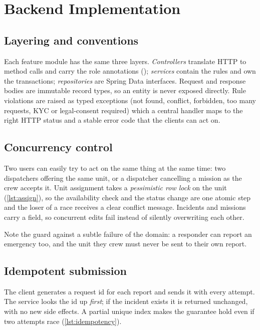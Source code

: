 \section{Backend Implementation}

\subsection{Layering and conventions}
Each feature module has the same three layers. \emph{Controllers} translate HTTP to method calls and carry the
role annotations (); \emph{services} contain the rules and own the transactions; \emph{repositories}
are Spring Data interfaces. Request and response bodies are immutable record types, so an entity is never exposed
directly. Rule violations are raised as typed exceptions (not found, conflict, forbidden, too many requests, KYC or
legal-consent required) which a central handler maps to the right HTTP status and a stable error code that the clients
can act on.

\subsection{Concurrency control}\label{sec:impl-concurrency}
Two users can easily try to act on the same thing at the same time: two dispatchers offering the same unit, or a
dispatcher cancelling a mission as the crew accepts it. Unit assignment takes a \emph{pessimistic row lock} on the unit
(\cref{lst:assign}), so the availability check and the status change are one atomic step and the loser of a race
receives a clear conflict message. Incidents and missions carry a  field, so concurrent edits fail instead
of silently overwriting each other.



Note the guard against a subtle failure of the domain: a responder can report an emergency too, and the unit they
crew must never be sent to their own report.

\subsection{Idempotent submission}
The client generates a request id for each report and sends it with every attempt. The service looks the id up
\emph{first}; if the incident exists it is returned unchanged, with no new side effects. A partial unique index makes the
guarantee hold even if two attempts race (\cref{lst:idempotency}).

